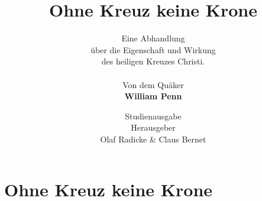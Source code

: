 \documentclass[pdftex,pagesize, 10pt]{scrbook}
\begin{document}
\null\newpage

\author{
Eine Abhandlung \\
über die Eigenschaft und Wirkung \\
des heiligen Kreuzes Christi.
\\
\\
Von dem Quäker
\\
\textbf{William Penn}
}

\title{Ohne Kreuz keine Krone}
\date{
\vspace{3cm}
Studienausgabe\\
\vfill
Herausgeber \\
Olaf Radicke \& Claus Bernet
}

\maketitle

\frontmatter

\tableofcontents



\mainmatter

 


\setcounter{secnumdepth}{-2}
\part{Ohne Kreuz keine Krone}

\end{document}
